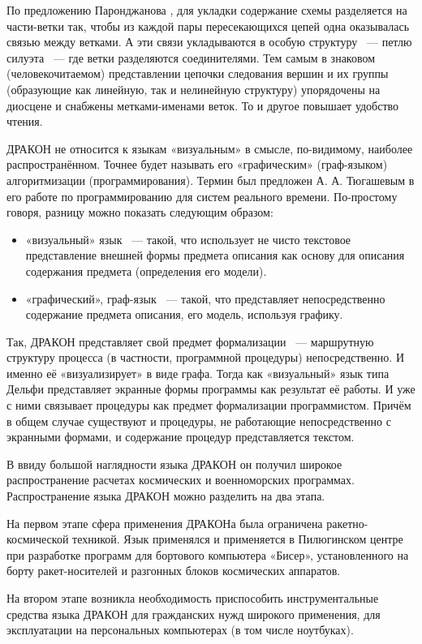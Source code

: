 По предложению Паронджанова \cite{Parondjanov1}, для укладки содержание схемы разделяется на части-ветки так, чтобы из каждой пары пересекающихся цепей одна оказывалась связью между ветками. А эти связи укладываются в особую структуру ~--- петлю силуэта ~--- где ветки разделяются соединителями. Тем самым в знаковом (человекочитаемом) представлении цепочки следования вершин и их группы (образующие как линейную, так и нелинейную структуру) упорядочены на диосцене и снабжены метками-именами веток. То и другое повышает удобство чтения.

ДРАКОН не относится к языкам «визуальным» в смысле, по-видимому, наиболее распространённом. Точнее будет называть его «графическим» (граф-языком) алгоритмизации (программирования). Термин был предложен А. А. Тюгашевым в его работе \cite{Tugashev} по программированию для систем реального времени.
По-простому говоря, разницу можно показать следующим образом:
\begin{itemize}
\item «визуальный» язык ~--- такой, что использует не чисто текстовое представление внешней формы предмета описания как основу для описания содержания предмета (определения его модели).
\item «графический», граф-язык ~--- такой, что представляет непосредственно содержание предмета описания, его модель, используя графику.
\end{itemize}

Так, ДРАКОН представляет свой предмет формализации ~--- маршрутную структуру процесса (в частности, программной процедуры) непосредственно. И именно её «визуализирует» в виде графа. Тогда как «визуальный» язык типа Дельфи представляет экранные формы программы как результат её работы. И уже с ними связывает процедуры как предмет формализации программистом. Причём в общем случае существуют и процедуры, не работающие непосредственно с экранными формами, и содержание процедур представляется текстом.

В ввиду большой наглядности языка ДРАКОН он получил широкое распространение расчетах космических и военноморских программах. Распространение языка ДРАКОН можно разделить на два этапа.

На первом этапе сфера применения ДРАКОНа была ограничена ракетно-космической техникой. Язык применялся и применяется в Пилюгинском центре при разработке программ для бортового компьютера «Бисер», установленного на борту ракет-носителей и разгонных блоков космических аппаратов.

На втором этапе возникла необходимость приспособить инструментальные средства языка ДРАКОН для гражданских нужд широкого применения, для эксплуатации на персональных компьютерах (в том числе ноутбуках).

